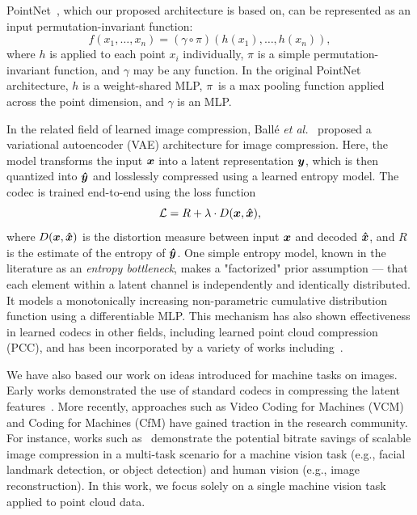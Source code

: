 
PointNet~\cite{qi2016pointnet}, which our proposed architecture is based on, can be represented as an input permutation-invariant function:
\[ f(x_1, \ldots, x_n) = (\gamma \circ \pi)(h(x_1), \ldots, h(x_n)), \]
where $h$ is applied to each point $x_i$ individually, $\pi$ is a simple permutation-invariant function, and $\gamma$ may be any function.
In the original PointNet architecture, $h$ is a weight-shared MLP, $\pi$~is a max pooling function applied across the point dimension, and $\gamma$ is an MLP.

In the related field of learned image compression, Ball{\'e} \emph{et al.}~\cite{balle2018variational} proposed a variational autoencoder (VAE) architecture for image compression.
Here, the model transforms the input ${\boldsymbol{x}}$ into a latent representation ${\boldsymbol{y}}$, which is then quantized into ${\boldsymbol{\hat{y}}}$ and losslessly compressed using a learned entropy model.
The codec is trained end-to-end using the loss function
\begin{equation}
    \mathcal{L} = R + \lambda \cdot D({\boldsymbol{x}}, {\boldsymbol{\hat{x}}}),
    \label{eq:rd-loss}
\end{equation}
where $D({\boldsymbol{x}}, {\boldsymbol{\hat{x}}})$ is the distortion measure between input ${\boldsymbol{x}}$ and decoded ${\boldsymbol{\hat{x}}}$, and $R$ is the estimate of the entropy of ${\boldsymbol{\hat{y}}}$.
One simple entropy model, known in the literature as an \emph{entropy bottleneck}, makes a "factorized" prior assumption --- that each element within a latent channel is independently and identically distributed.
It models a monotonically increasing non-parametric cumulative distribution function using a differentiable MLP.
This mechanism has also shown effectiveness in learned codecs in other fields, including learned point cloud compression (PCC), and has been incorporated by a variety of works including~\cite{yan2019deep,he2022density,pang2022graspnet,fu2022octattention,you2022ipdae}.

We have also based our work on ideas introduced for machine tasks on images.
Early works demonstrated the use of standard codecs in compressing the latent features~\cite{choi2018mmsp}.
More recently, approaches such as Video Coding for Machines (VCM)~\cite{duan2020vcm} and Coding for Machines (CfM) have gained traction in the research community.
For instance, works such as~\cite{hu2020towardscfhmvscalable,choi2022sichm} demonstrate the potential bitrate savings of scalable image compression in a multi-task scenario for a machine vision task (e.g., facial landmark detection, or object detection) and human vision (e.g., image reconstruction).
In this work, we focus solely on a single machine vision task applied to point cloud data.




